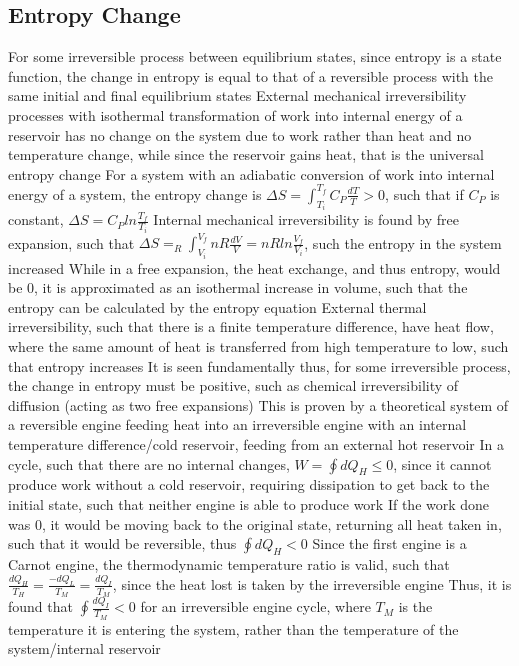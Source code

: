 \subsection{Entropy Change}
\begin{outline*}
\1 For some irreversible process between equilibrium states, since entropy is a state function, the change in entropy is equal to that of a reversible process with the same initial and final equilibrium states
\2 External mechanical irreversibility processes with isothermal transformation of work into internal energy of a reservoir has no change on the system due to work rather than heat and no temperature change, while since the reservoir gains heat, that is the universal entropy change
\3 For a system with an adiabatic conversion of work into internal energy of a system, the entropy change is $\Delta S = \int^{T_f}_{T_i} C_P \frac{dT}{T} > 0$, such that if $C_P$ is constant, $\Delta S = C_P ln\frac{T_f}{T_i}$
\2 Internal mechanical irreversibility is found by free expansion, such that $\Delta S = _R\int_{V_i}^{V_f} nR \frac{dV}{V} = nR ln\frac{V_f}{V_i}$, such the entropy in the system increased
\3 While in a free expansion, the heat exchange, and thus entropy, would be 0, it is approximated as an isothermal increase in volume, such that the entropy can be calculated by the entropy equation
\2 External thermal irreversibility, such that there is a finite temperature difference, have heat flow, where the same amount of heat is transferred from high temperature to low, such that entropy increases
\2 It is seen fundamentally thus, for some irreversible process, the change in entropy must be positive, such as chemical irreversibility of diffusion (acting as two free expansions)
\2 This is proven by a theoretical system of a reversible engine feeding heat into an irreversible engine with an internal temperature difference/cold reservoir, feeding from an external hot reservoir
\3 In a cycle, such that there are no internal changes, $W = \oint dQ_{H} \leq 0$, since it cannot produce work without a cold reservoir, requiring dissipation to get back to the initial state, such that neither engine is able to produce work
\3 If the work done was 0, it would be moving back to the original state, returning all heat taken in, such that it would be reversible, thus $\oint dQ_H < 0$
\3 Since the first engine is a Carnot engine, the thermodynamic temperature ratio is valid, such that $\frac{dQ_H}{T_H} = \frac{-dQ_L}{T_M} = \frac{dQ_I}{T_M}$, since the heat lost is taken by the irreversible engine
\3 Thus, it is found that $\oint \frac{dQ_I}{T_M} < 0$ for an irreversible engine cycle, where $T_M$ is the temperature it is entering the system, rather than the temperature of the system/internal reservoir

\end{outline*}

